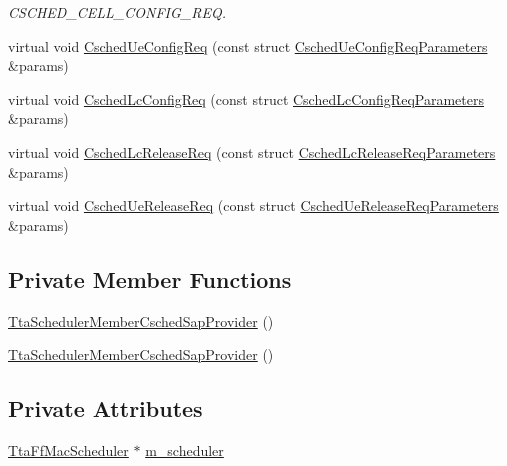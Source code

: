 \begin{DoxyCompactItemize}
\begin{DoxyCompactList}\small\item\em C\+S\+C\+H\+E\+D\+\_\+\+C\+E\+L\+L\+\_\+\+C\+O\+N\+F\+I\+G\+\_\+\+R\+EQ. \end{DoxyCompactList}\item 
virtual void \hyperlink{classns3_1_1TtaSchedulerMemberCschedSapProvider_a17cb55ba638a43ea58643626118112fa}{Csched\+Ue\+Config\+Req} (const struct \hyperlink{structns3_1_1FfMacCschedSapProvider_1_1CschedUeConfigReqParameters}{Csched\+Ue\+Config\+Req\+Parameters} \&params)
\item 
virtual void \hyperlink{classns3_1_1TtaSchedulerMemberCschedSapProvider_a61216b754ddd0d880d70938a7eb7b3f4}{Csched\+Lc\+Config\+Req} (const struct \hyperlink{structns3_1_1FfMacCschedSapProvider_1_1CschedLcConfigReqParameters}{Csched\+Lc\+Config\+Req\+Parameters} \&params)
\item 
virtual void \hyperlink{classns3_1_1TtaSchedulerMemberCschedSapProvider_a1ffd841ab2369eff3ae7e0ed9cf3722e}{Csched\+Lc\+Release\+Req} (const struct \hyperlink{structns3_1_1FfMacCschedSapProvider_1_1CschedLcReleaseReqParameters}{Csched\+Lc\+Release\+Req\+Parameters} \&params)
\item 
virtual void \hyperlink{classns3_1_1TtaSchedulerMemberCschedSapProvider_aab6396eb0a8e7fe6c4fb47df256124e6}{Csched\+Ue\+Release\+Req} (const struct \hyperlink{structns3_1_1FfMacCschedSapProvider_1_1CschedUeReleaseReqParameters}{Csched\+Ue\+Release\+Req\+Parameters} \&params)
\end{DoxyCompactItemize}
\subsection*{Private Member Functions}
\begin{DoxyCompactItemize}
\item 
\hyperlink{classns3_1_1TtaSchedulerMemberCschedSapProvider_aff8c601b4528cdfa02ee95ceec6fd015}{Tta\+Scheduler\+Member\+Csched\+Sap\+Provider} ()
\item 
\hyperlink{classns3_1_1TtaSchedulerMemberCschedSapProvider_aff8c601b4528cdfa02ee95ceec6fd015}{Tta\+Scheduler\+Member\+Csched\+Sap\+Provider} ()
\end{DoxyCompactItemize}
\subsection*{Private Attributes}
\begin{DoxyCompactItemize}
\item 
\hyperlink{classns3_1_1TtaFfMacScheduler}{Tta\+Ff\+Mac\+Scheduler} $\ast$ \hyperlink{classns3_1_1TtaSchedulerMemberCschedSapProvider_a7c4395b4b5121ddd9ec3395da175044d}{m\+\_\+scheduler}
\end{DoxyCompactItemize}


